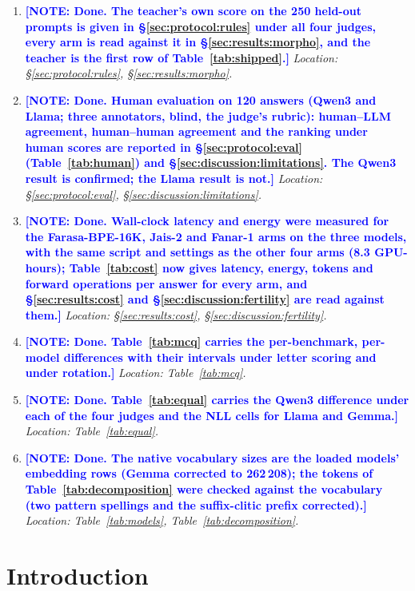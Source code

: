 \documentclass[a4paper,fleqn]{cas-sc}
\newcommand{\note}[1]{\textcolor{blue}{\textbf{[NOTE: #1]}}}
\begin{document}
\begin{enumerate}
\item \note{Done. The teacher's own score on the 250 held-out prompts is given in \S\ref{sec:protocol:rules} under all four judges, every arm is read against it in \S\ref{sec:results:morpho}, and the teacher is the first row of Table~\ref{tab:shipped}.} \emph{Location: \S\ref{sec:protocol:rules}, \S\ref{sec:results:morpho}.}
\item \note{Done. Human evaluation on 120 answers (Qwen3 and Llama; three annotators, blind, the judge's rubric): human--LLM agreement, human--human agreement and the ranking under human scores are reported in \S\ref{sec:protocol:eval} (Table~\ref{tab:human}) and \S\ref{sec:discussion:limitations}. The Qwen3 result is confirmed; the Llama result is not.} \emph{Location: \S\ref{sec:protocol:eval}, \S\ref{sec:discussion:limitations}.}
\item \note{Done. Wall-clock latency and energy were measured for the Farasa-BPE-16K, Jais-2 and Fanar-1 arms on the three models, with the same script and settings as the other four arms (8.3 GPU-hours); Table~\ref{tab:cost} now gives latency, energy, tokens and forward operations per answer for every arm, and \S\ref{sec:results:cost} and \S\ref{sec:discussion:fertility} are read against them.} \emph{Location: \S\ref{sec:results:cost}, \S\ref{sec:discussion:fertility}.}
\item \note{Done. Table~\ref{tab:mcq} carries the per-benchmark, per-model differences with their intervals under letter scoring and under rotation.} \emph{Location: Table~\ref{tab:mcq}.}
\item \note{Done. Table~\ref{tab:equal} carries the Qwen3 difference under each of the four judges and the NLL cells for Llama and Gemma.} \emph{Location: Table~\ref{tab:equal}.}
\item \note{Done. The native vocabulary sizes are the loaded models' embedding rows (Gemma corrected to 262\,208); the tokens of Table~\ref{tab:decomposition} were checked against the vocabulary (two pattern spellings and the suffix-clitic prefix corrected).} \emph{Location: Table~\ref{tab:models}, Table~\ref{tab:decomposition}.}
\end{enumerate}

\newpage

\section{Introduction}
\label{sec:intro}
\end{document}
